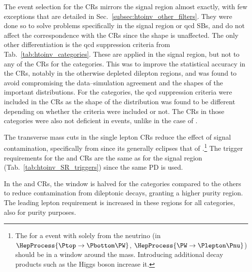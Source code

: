 \noindent{}The event selection for the \glspl{CR} mirrors the signal region almost exactly, with few exceptions that are detailed in Sec.~\ref{subsec:htoinv_other_filters}. They were done so to solve problems specifically in the signal region or \acrshort{qcd} \glspl{SB}, and do not affect the correspondence with the \glspl{CR} since the \ptmiss shape is unaffected. The only other differentiation is the \acrshort{qcd} suppression criteria from Tab.~\ref{tab:htoinv_categories}. These are applied in the signal region, but not to any of the \glspl{CR} for the \ttH categories. This was to improve the statistical accuracy in the \glspl{CR}, notably in the otherwise depleted dilepton regions, and was found to avoid compromising the data--simulation agreement and the shapes of the important distributions. For the \VH categories, the \acrshort{qcd} suppression criteria were included in the \glspl{CR} as the shape of the \ptmiss distribution was found to be different depending on whether the criteria were included or not. The \glspl{CR} in those categories were also not deficient in events, unlike in the case of \ttH.

The transverse mass cuts in the single lepton \glspl{CR} reduce the effect of signal contamination, specifically from \ttH since its \mT generally eclipses that of \ttbar.\footnote{The \mT for a \ttbar event with \ptvecmiss solely from the neutrino (in $\HepProcess{\Ptop \to \Pbottom\PW}$, $\HepProcess{\PW \to \Plepton\Pnu}$) should be in a window around the \PW mass. Introducing additional decay products such as the Higgs boson increase it.} The trigger requirements for the \singleMuCr and \doubleMuCr \glspl{CR} are the same as for the signal region (Tab.~\ref{tab:htoinv_SR_triggers}) since the same \gls{PD} is used.

In the \doubleMuCr and \doubleEleCr \glspl{CR}, the \doubleLepMass window is halved for the \ttH categories compared to the others to reduce contamination from dileptonic \ttbar decays, granting a higher purity \ztolplmpjets region. The leading lepton \pt requirement is increased in these regions for all categories, also for purity purposes.

